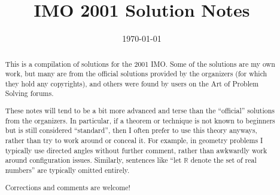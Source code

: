 \documentclass[11pt]{scrartcl}
\title{IMO 2001 Solution Notes}
\date{\today}
\begin{document}
\maketitle

\begin{abstract}
This is a compilation of solutions
for the 2001 IMO.
Some of the solutions are my own work,
but many are from the official solutions provided by the organizers
(for which they hold any copyrights),
and others were found by users on the Art of Problem Solving forums.

These notes will tend to be a bit more advanced and terse than the ``official''
solutions from the organizers.
In particular, if a theorem or technique is not known to beginners
but is still considered ``standard'', then I often prefer to
use this theory anyways, rather than try to work around or conceal it.
For example, in geometry problems I typically use directed angles
without further comment, rather than awkwardly work around configuration issues.
Similarly, sentences like ``let $\mathbb{R}$ denote the set of real numbers''
are typically omitted entirely.

Corrections and comments are welcome!
\end{abstract}

\tableofcontents
\newpage

\addtocounter{section}{-1}
\end{document}
